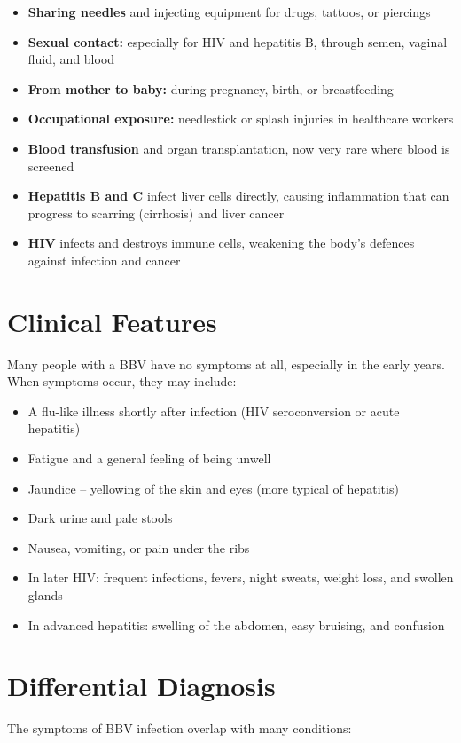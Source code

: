 \begin{itemize}
    \item \textbf{Sharing needles} and injecting equipment for drugs, tattoos, or piercings
    \item \textbf{Sexual contact:} especially for HIV and hepatitis B, through semen, vaginal fluid, and blood
    \item \textbf{From mother to baby:} during pregnancy, birth, or breastfeeding
    \item \textbf{Occupational exposure:} needlestick or splash injuries in healthcare workers
    \item \textbf{Blood transfusion} and organ transplantation, now very rare where blood is screened
    \item \textbf{Hepatitis B and C} infect liver cells directly, causing inflammation that can progress to scarring (cirrhosis) and liver cancer
    \item \textbf{HIV} infects and destroys immune cells, weakening the body's defences against infection and cancer
\end{itemize}

\section*{Clinical Features}
Many people with a BBV have no symptoms at all, especially in the early years. When symptoms occur, they may include:

\begin{itemize}
    \item A flu-like illness shortly after infection (HIV seroconversion or acute hepatitis)
    \item Fatigue and a general feeling of being unwell
    \item Jaundice -- yellowing of the skin and eyes (more typical of hepatitis)
    \item Dark urine and pale stools
    \item Nausea, vomiting, or pain under the ribs
    \item In later HIV: frequent infections, fevers, night sweats, weight loss, and swollen glands
    \item In advanced hepatitis: swelling of the abdomen, easy bruising, and confusion
\end{itemize}

\section*{Differential Diagnosis}
The symptoms of BBV infection overlap with many conditions:

